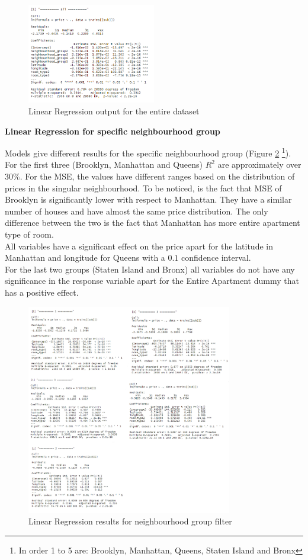 \documentclass{FR16}
\begin{document}
\begin{figure}[H]
\centering
\includegraphics[width=0.5\textwidth]{figures/lm1.PNG} 
\caption{\label{fig:5} Linear Regression output for the entire dataset}
\end{figure}
\newpage
\noindent \textbf{Linear Regression for specific neighbourhood group}

\noindent Models give different results for the specific neighbourhood group (Figure \ref{fig:6} \footnote{In order 1 to 5 are: Brooklyn, Manhattan, Queens, Staten Island and Bronx}). For the first three (Brooklyn, Manhattan and Queens) $R^2$ are  approximately over $30\%$. For the MSE, the values have different ranges based on the distribution of prices in the singular neighbourhood. To be noticed, is the fact that MSE of Brooklyn is significantly lower with respect to Manhattan. They have a similar number of houses and have almost the same price distribution. The only difference between the two is the fact that Manhattan has more entire apartment type of room. 
\\ All variables have a significant effect on the price apart for the latitude in Manhattan and longitude for Queens with a $0.1$ confidence interval.  \\
For the last two groups (Staten Island and Bronx) all variables do not have any significance in the response variable apart for the Entire Apartment dummy that has a positive effect. 
\begin{figure}[H]
\centering
\includegraphics[width=0.8\textwidth]{figures/lm2.jpg} 
\caption{\label{fig:6}  Linear Regression results for neighbourhood group filter }
\end{figure}
\end{document}
